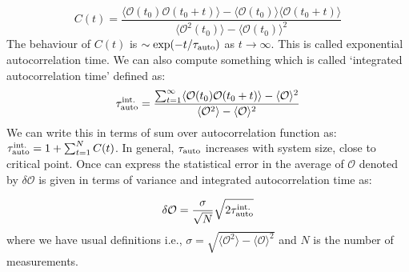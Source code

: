 \documentclass[11pt]{article}
\begin{document}
 \begin{equation}
 	C(t) = \frac{\langle \mathcal{O}(t_0) \mathcal{O}(t_0 + t) \rangle - \langle \mathcal{O}(t_0)\rangle \langle \mathcal{O}(t_0 + t) \rangle}{\langle \mathcal{O}^2(t_0)\rangle - \langle \mathcal{O}(t_0)\rangle^{2}}
 \end{equation}
The behaviour of $C(t)$ is $\sim \exp(-t/\tau_{\rm{auto}})$ as $ t \to \infty$. This is called exponential autocorrelation time. We can also compute something which is called `integrated autocorrelation time' defined as:
\begin{equation}
	\tau_{\rm{auto}}^{\rm{int.}} = \frac{\sum_{t=1}^{\infty} \langle \mathcal{O}(t_0) \mathcal{O}(t_0 + t) \rangle - \langle \mathcal{O} \rangle^2 }{\langle \mathcal{O}^2\rangle - \langle \mathcal{O}\rangle^{2}}
\end{equation}
We can write this in terms of sum over autocorrelation function as: $\tau_{\rm{auto}}^{\rm{int.}} = 1 + \sum_{t=1}^{N} C(t)$. In general, $ \tau_{\rm{auto}}$ increases with system size, close to critical point. Once can express the statistical error in the average of $\mathcal{O}$ denoted by $\delta \mathcal{O}$ is given in terms of variance and integrated autocorrelation time as:

\begin{equation}
	\delta \mathcal{O} = \frac{\sigma}{\sqrt{N}} \sqrt{2 \tau_{\rm{auto}}^{\rm{int.}}}
\end{equation}
where we have usual definitions i.e., 
$\sigma = \sqrt{\langle \mathcal{O}^2\rangle - \langle \mathcal{O}\rangle^{2}}$ and $N$ is the number of measurements. 
\end{document}
